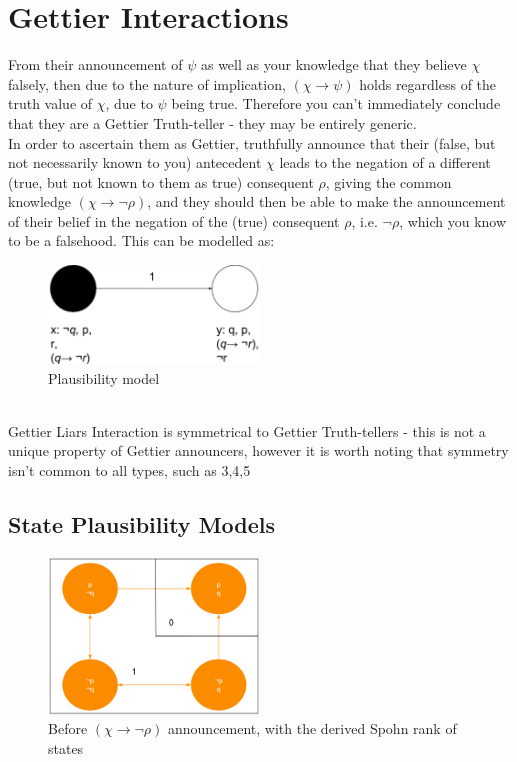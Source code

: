 \documentclass[12pt, titlepage, twoside, a4paper]{report}
\begin{document}
\section{Gettier Interactions}
From their announcement of $\psi$ as well as your knowledge that they believe $\chi$ falsely, then due to the nature of implication, $(\chi \to \psi)$ holds regardless of the truth value of $\chi$, due to $\psi$ being true. Therefore you can't immediately conclude that they are a Gettier Truth-teller - they may be entirely generic.\\
In order to ascertain them as Gettier, truthfully announce that their (false, but not necessarily known to you) antecedent $\chi$ leads to the negation of a different (true, but not known to them as true) consequent $\rho$,  giving the common knowledge $(\chi \to \neg \rho)$, and they should then be able to make the announcement of their belief in the negation of the (true) consequent $\rho$, i.e. $\neg \rho$, which you know to be a falsehood. This can be modelled as:\\
\begin{figure}[h]
  \centering
  \includegraphics[width=0.5\textwidth]{gettiermodelbase.eps}
  \caption{Plausibility model}
\end{figure}\\
Gettier Liars Interaction is symmetrical to Gettier Truth-tellers - this is not a unique property  of Gettier announcers, however it is worth noting that symmetry isn't common to all types, such as 3,4,5

\subsection{State Plausibility Models}

\begin{figure}[h]
  \centering
  \includegraphics[width=0.5\textwidth]{slide19.eps}
  \caption{Before $(\chi \to \neg \rho)$ announcement, with the derived Spohn rank of states}
\end{figure}
\end{document}
